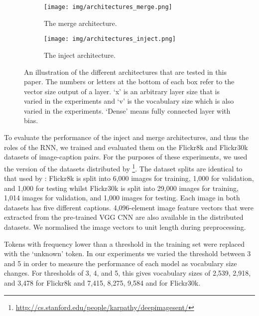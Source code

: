 \documentclass[11pt,letterpaper]{article}
\begin{document}
\begin{figure}
	\centering
	
	\begin{subfigure}{0.45\textwidth}
      \caption{
          \label{fig:architectures_merge}
          The merge architecture.
      }
      \centering
      \texttt{[image: img/architectures\_merge.png]}
	\end{subfigure}
    
	\vspace{10pt}
	
    \begin{subfigure}{0.45\textwidth}
      \caption{
          \label{fig:architectures_inject}
          The inject architecture.
      }
      \centering
      \texttt{[image: img/architectures\_inject.png]}
	\end{subfigure}
	
	\caption{
		\label{fig:architectures}
		An illustration of the different architectures that are tested in this paper. The numbers or letters at the bottom of each box refer to the vector size output of a layer. `x' is  an arbitrary layer size that is varied in the experiments and `v' is the vocabulary size which is also varied in the experiments. `Dense' means fully connected layer with bias.
	}
\end{figure}

To evaluate the performance of the inject and merge architectures, and thus the roles of the RNN, we trained and evaluated them on the Flickr8k \cite{Hodosh2013} and Flickr30k \cite{Young2014} datasets of image-caption pairs. For the purposes of these experiments, we used the version of the datasets distributed by \footnote{\url{http://cs.stanford.edu/people/karpathy/deepimagesent/}}. The dataset splits are identical to that used by : Flickr8k is split into 6,000 images for training, 1,000 for validation, and 1,000 for testing whilst Flickr30k is split into 29,000 images for training, 1,014 images for validation, and 1,000 images for testing. Each image in both datasets has five different captions. 4,096-element image feature vectors that were extracted from the pre-trained VGG CNN \cite{Simonyan2014} are also available in the distributed datasets. We normalised the image vectors to unit length during preprocessing.

Tokens with frequency lower than a threshold in the training set were replaced with the `unknown' token. In our experiments we varied the threshold between 3 and 5 in order to measure the performance of each model as vocabulary size changes. For thresholds of 3, 4, and 5, this gives vocabulary sizes of 2,539, 2,918, and 3,478 for Flickr8k and 7,415, 8,275, 9,584 and  for Flickr30k.
\end{document}
